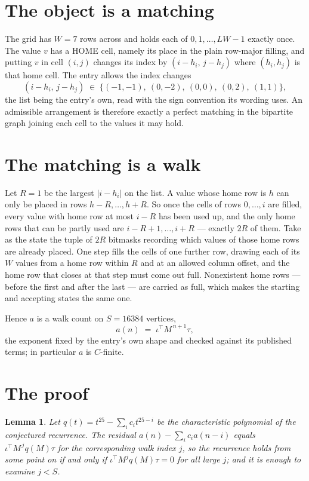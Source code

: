 \documentclass[11pt,a4paper]{article}
\theoremstyle{plain}
\newtheorem{lemma}[theorem]{Lemma}
\theoremstyle{definition}
\begin{document}
\section{The object is a matching}

The grid has $W=7$ rows across and holds each of $0,1,\dots,LW-1$ exactly once. The value
$v$ has a HOME cell, namely its place in the plain row-major filling, and putting $v$ in cell
$(i,j)$ changes its index by $(i-h_i,\,j-h_j)$ where $(h_i,h_j)$ is that home cell. The entry
allows the index changes
\[
(i-h_i,\,j-h_j)\;\in\;\{(-1,-1),\ (0,-2),\ (0,0),\ (0,2),\ (1,1)\},
\]
the list being the entry's own, read with the sign convention its wording uses. An admissible
arrangement is therefore exactly a perfect matching in the bipartite graph joining each cell to
the values it may hold.

\section{The matching is a walk}

Let $R=1$ be the largest $|i-h_i|$ on the list. A value whose home row is $h$ can only be
placed in rows $h-R,\dots,h+R$. So once the cells of rows $0,\dots,i$ are filled, every
value with home row at most $i-R$ has been used up, and the only home rows that can be
partly used are $i-R+1,\dots,i+R$ --- exactly $2R$ of them. Take as the state the tuple of
$2R$ bitmasks recording which values of those home rows are already placed. One step fills
the cells of one further row, drawing each of its $W$ values from a home row within $R$
and at an allowed column offset, and the home row that closes at that step must come out
full. Nonexistent home rows --- before the first and after the last --- are carried as
full, which makes the starting and accepting states the same one.

Hence $a$ is a walk count on $S=16384$ vertices,
\[
a(n)\;=\;\iota^{\!\top}M^{\,n+1}\tau ,
\]
the exponent fixed by the entry's own shape and checked against its published terms; in
particular $a$ is $C$-finite.

\section{The proof}

\begin{lemma}\label{lem:crit}
Let $q(t)=t^{25}-\sum_i c_it^{25-i}$ be the characteristic polynomial of the
conjectured recurrence. The residual $a(n)-\sum_ic_ia(n-i)$ equals
$\iota^{\!\top}M^{\,j}q(M)\tau$ for the corresponding walk index $j$, so the recurrence
holds from some point on if and only if $\iota^{\!\top}M^{j}q(M)\tau=0$ for all large $j$;
and it is enough to examine $j<S$.
\end{lemma}
\end{document}
